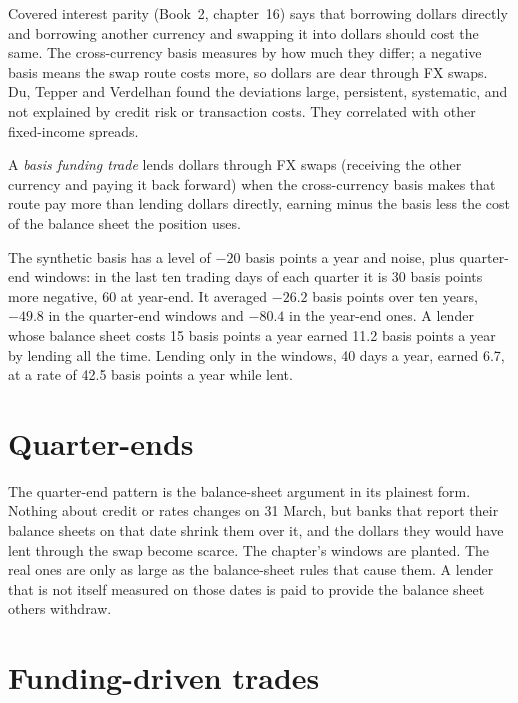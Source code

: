Covered interest parity (Book~2, chapter~16) says that borrowing dollars directly and borrowing another currency and swapping it into dollars should
cost the same. The cross-currency basis measures by how much they differ; a negative basis means the swap route costs more, so dollars are dear through
FX swaps. Du, Tepper and Verdelhan found the deviations large, persistent, systematic, and not explained by credit risk or transaction costs. They
correlated with other fixed-income spreads.

\begin{definition}\label{def:s2:cross-currency-basis-and-fx-carry:funding}
A \emph{basis funding trade} lends dollars through FX swaps (receiving the other currency and paying it back forward) when
the cross-currency basis makes that route pay more than lending dollars directly, earning minus the basis less the cost of the balance sheet the
position uses.
\end{definition}

The synthetic basis has a level of $-20$ basis points a year and noise, plus quarter-end windows: in the last ten trading days of each quarter it is
30 basis points more negative, 60 at year-end. It averaged $-26.2$ basis points over ten years, $-49.8$ in the quarter-end windows and $-80.4$ in the
year-end ones. A lender whose balance sheet costs 15 basis points a year earned 11.2 basis
points a year by lending all the time. Lending only in the windows, 40 days a year, earned 6.7, at a rate of 42.5 basis points a year while lent.

\section{Quarter-ends}

The quarter-end pattern is the balance-sheet argument in its plainest form. Nothing about credit or rates changes on 31 March, but banks that report
their balance sheets on that date shrink them over it, and the dollars they would have lent through the swap become scarce. The chapter's windows are
planted. The real ones are only as large as the balance-sheet rules that cause them. A lender that is not itself measured on those dates is paid to
provide the balance sheet others withdraw.

\section{Funding-driven trades}

